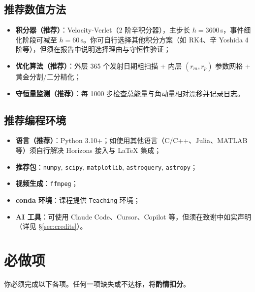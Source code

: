 \documentclass[11pt,a4paper]{ctexart}
\begin{document}
\subsection{推荐数值方法}

\begin{itemize}[leftmargin=*]
    \item \textbf{积分器（推荐）}：Velocity-Verlet（2 阶辛积分器），主步长 $h = 3600$\,s，事件细化阶段可减至 $h = 60$\,s。你可自行选择其他积分方案（如 RK4、辛 Yoshida 4 阶等），但须在报告中说明选择理由与守恒性验证；
    \item \textbf{优化算法（推荐）}：外层 365 个发射日期粗扫描 + 内层 $(r_m, r_p)$ 参数网格 + 黄金分割/二分精化；
    \item \textbf{守恒量监测（推荐）}：每 1000 步检查总能量与角动量相对漂移并记录日志。
\end{itemize}

\subsection{推荐编程环境}

\begin{itemize}[leftmargin=*]
    \item \textbf{语言（推荐）}：Python 3.10+；如使用其他语言（C/C++、Julia、MATLAB 等）须自行解决 Horizons 接入与 LaTeX 集成；
    \item \textbf{推荐包}：\texttt{numpy}, \texttt{scipy}, \texttt{matplotlib}, \texttt{astroquery}, \texttt{astropy}；
    \item \textbf{视频生成}：\texttt{ffmpeg}；
    \item \textbf{conda 环境}：课程提供 \texttt{Teaching} 环境；
    \item \textbf{AI 工具}：可使用 Claude Code、Cursor、Copilot 等，但须在致谢中如实声明（详见 §\ref{sec:credits}）。
\end{itemize}

\section{必做项}

你必须完成以下各项。任何一项缺失或不达标，将\textbf{酌情扣分}。
\end{document}
